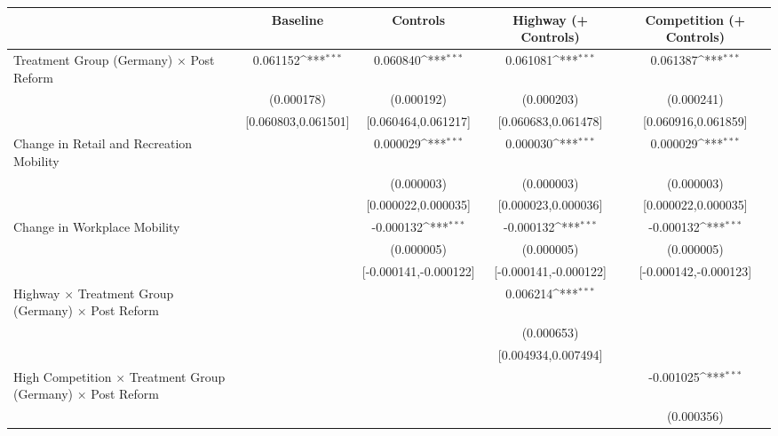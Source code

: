 {
\def\sym#1{\ifmmode^{#1}\else\(^{#1}\)\fi}
\begin{tabular}{l*{4}{c}}
\toprule
                    &\multicolumn{1}{c}{Baseline}&\multicolumn{1}{c}{Controls}&\multicolumn{1}{c}{Highway (+ Controls)}&\multicolumn{1}{c}{Competition (+ Controls)}\\
\midrule
Treatment Group (Germany) $\times$ Post Reform&    0.061152\sym{***}&    0.060840\sym{***}&    0.061081\sym{***}&    0.061387\sym{***}\\
                    &  (0.000178)         &  (0.000192)         &  (0.000203)         &  (0.000241)         \\
                    &[0.060803,0.061501]         &[0.060464,0.061217]         &[0.060683,0.061478]         &[0.060916,0.061859]         \\
Change in Retail and Recreation Mobility&                     &    0.000029\sym{***}&    0.000030\sym{***}&    0.000029\sym{***}\\
                    &                     &  (0.000003)         &  (0.000003)         &  (0.000003)         \\
                    &                     &[0.000022,0.000035]         &[0.000023,0.000036]         &[0.000022,0.000035]         \\
Change in Workplace Mobility&                     &   -0.000132\sym{***}&   -0.000132\sym{***}&   -0.000132\sym{***}\\
                    &                     &  (0.000005)         &  (0.000005)         &  (0.000005)         \\
                    &                     &[-0.000141,-0.000122]         &[-0.000141,-0.000122]         &[-0.000142,-0.000123]         \\
Highway $\times$ Treatment Group (Germany) $\times$ Post Reform&                     &                     &    0.006214\sym{***}&                     \\
                    &                     &                     &  (0.000653)         &                     \\
                    &                     &                     &[0.004934,0.007494]         &                     \\
High Competition $\times$ Treatment Group (Germany) $\times$ Post Reform&                     &                     &                     &   -0.001025\sym{***}\\
                    &                     &                     &                     &  (0.000356)         \\

\end{tabular}}
